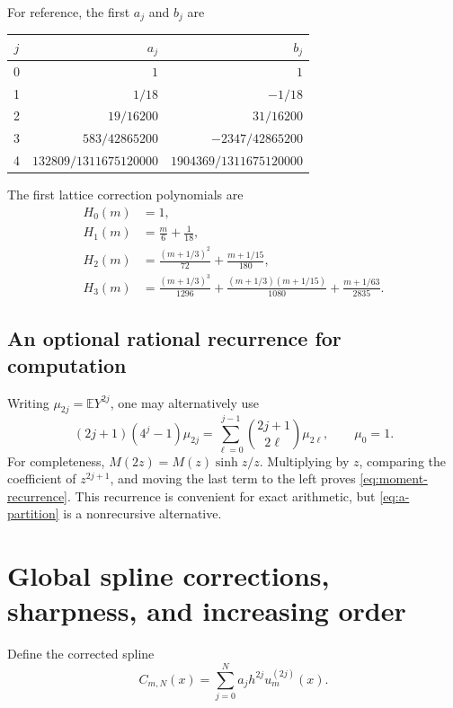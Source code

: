 \documentclass[11pt,a4paper]{article}
\numberwithin{equation}{section}
\theoremstyle{definition}
\newcommand{\E}{\mathbb E}
\begin{document}
For reference, the first $a_j$ and $b_j$ are
\begin{center}
\renewcommand{\arraystretch}{1.45}
\begin{tabular}{c@{\qquad}r@{\qquad}r}
\toprule
$j$ & $a_j$ & $b_j$\\
\midrule
0 & $1$ & $1$\\
1 & $1/18$ & $-1/18$\\
2 & $19/16200$ & $31/16200$\\
3 & $583/42865200$ & $-2347/42865200$\\
4 & $132809/1311675120000$ & $1904369/1311675120000$\\
\bottomrule
\end{tabular}
\end{center}
The first lattice correction polynomials are
\begin{align}
 H_0(m)&=1,\nonumber\\
 H_1(m)&=\frac m6+\frac1{18},\label{eq:H-first}\\
 H_2(m)&=\frac{(m+1/3)^2}{72}+\frac{m+1/15}{180},\nonumber\\
 H_3(m)&=\frac{(m+1/3)^3}{1296}
      +\frac{(m+1/3)(m+1/15)}{1080}
      +\frac{m+1/63}{2835}.\nonumber
\end{align}

\subsection{An optional rational recurrence for computation}

Writing $\mu_{2j}=\E Y^{2j}$, one may alternatively use
\begin{equation}
 (2j+1)(4^j-1)\mu_{2j}
 =\sum_{\ell=0}^{j-1}\binom{2j+1}{2\ell}\mu_{2\ell},
 \qquad \mu_0=1.
 \label{eq:moment-recurrence}
\end{equation}
For completeness, $M(2z)=M(z)\sinh z/z$. Multiplying by $z$,
comparing the coefficient of $z^{2j+1}$, and moving the last term
to the left proves \eqref{eq:moment-recurrence}. This recurrence is
convenient for exact arithmetic, but \eqref{eq:a-partition} is a
nonrecursive alternative.

\section{Global spline corrections, sharpness, and increasing order}\label{sec:global}

Define the corrected spline
\begin{equation}
 C_{m,N}(x)=\sum_{j=0}^N a_jh^{2j}u_m^{(2j)}(x).
 \label{eq:corrected-spline}
\end{equation}
\end{document}
